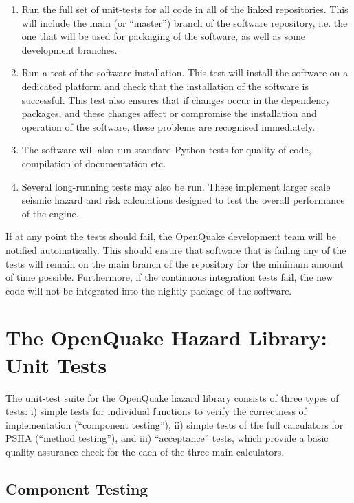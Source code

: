\begin{enumerate}
\item Run the full set of unit-tests for all code in all of the linked repositories. This will include the main (or ``master'') branch of the software repository, i.e. the one that will be used for packaging of the software, as well as some development branches.

\item Run a test of the software installation. This test will install the software on a dedicated platform and check that the installation of the software is successful. This test also ensures that if changes occur in the dependency packages, and these changes affect or compromise the installation and operation of the software, these problems are recognised immediately.

\item The software will also run standard Python tests for quality of code, compilation of documentation etc.

\item Several long-running tests may also be run. These implement larger scale seismic hazard and risk calculations designed to test the overall performance of the engine. 
\end{enumerate}

If at any point the tests should fail, the OpenQuake development team will be notified automatically. This should ensure that software that is failing any of the tests will remain on the main branch of the repository for the minimum amount of time possible. Furthermore, if the continuous integration tests fail, the new code will not be integrated into the nightly package of the software. 

\section{The OpenQuake Hazard Library: Unit Tests}

The unit-test suite for the OpenQuake hazard library consists of three types of tests: i) simple tests for individual functions to verify the correctness of implementation (``component testing''), ii) simple tests of the full calculators for PSHA (``method testing''), and iii) ``acceptance'' tests, which provide a basic quality assurance check for the each of the three main calculators. 

\subsection{Component Testing}


